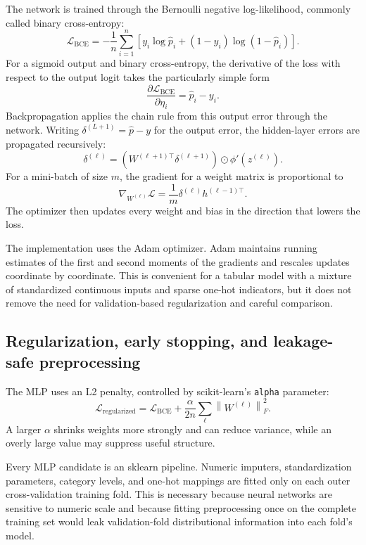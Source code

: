 The network is trained through the Bernoulli negative log-likelihood, commonly called binary cross-entropy:
\[
\mathcal{L}_{\mathrm{BCE}}
=
-\frac{1}{n}
\sum_{i=1}^{n}
\left[
y_i\log\widehat{p}_i
+
(1-y_i)\log(1-\widehat{p}_i)
\right].
\]
For a sigmoid output and binary cross-entropy, the derivative of the loss with respect to the output logit takes the particularly simple form
\[
\frac{\partial \mathcal{L}_{\mathrm{BCE}}}{\partial \eta_i}
=
\widehat{p}_i-y_i.
\]
Backpropagation applies the chain rule from this output error through the network. Writing \(\delta^{(L+1)}=\widehat{p}-y\) for the output error, the hidden-layer errors are propagated recursively:
\[
\delta^{(\ell)}
=
\left(W^{(\ell+1)\top}\delta^{(\ell+1)}\right)
\odot
\phi'\!\left(z^{(\ell)}\right).
\]
For a mini-batch of size \(m\), the gradient for a weight matrix is proportional to
\[
\nabla_{W^{(\ell)}}\mathcal{L}
=
\frac{1}{m}\delta^{(\ell)}h^{(\ell-1)\top}.
\]
The optimizer then updates every weight and bias in the direction that lowers the loss.

The implementation uses the Adam optimizer. Adam maintains running estimates of the first and second moments of the gradients and rescales updates coordinate by coordinate. This is convenient for a tabular model with a mixture of standardized continuous inputs and sparse one-hot indicators, but it does not remove the need for validation-based regularization and careful comparison.

\subsection{Regularization, early stopping, and leakage-safe preprocessing}

The MLP uses an L2 penalty, controlled by scikit-learn's \texttt{alpha} parameter:
\[
\mathcal{L}_{\mathrm{regularized}}
=
\mathcal{L}_{\mathrm{BCE}}
+
\frac{\alpha}{2n}\sum_{\ell}\left\lVert W^{(\ell)}\right\rVert_F^2.
\]
A larger \(\alpha\) shrinks weights more strongly and can reduce variance, while an overly large value may suppress useful structure.

Every MLP candidate is an sklearn pipeline. Numeric imputers, standardization parameters, category levels, and one-hot mappings are fitted only on each outer cross-validation training fold. This is necessary because neural networks are sensitive to numeric scale and because fitting preprocessing once on the complete training set would leak validation-fold distributional information into each fold's model.

